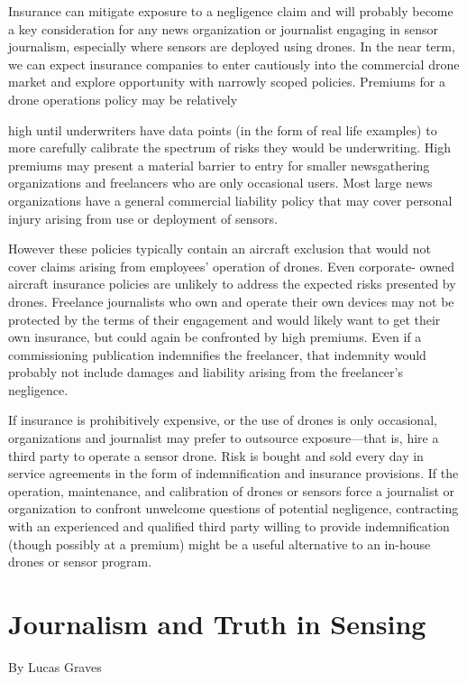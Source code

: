 \begin{itemize}
\begin{itemized}
Insurance can mitigate exposure to a negligence claim and will probably
become a key consideration for any news organization or journalist engaging
in sensor journalism, especially where sensors are deployed using drones.
In the near term, we can expect insurance companies to enter cautiously
into the commercial drone market and explore opportunity with narrowly
scoped policies. Premiums for a drone operations policy may be relatively

high until underwriters have data points (in the form of real life examples)
to more carefully calibrate the spectrum of risks they would be underwriting.
High premiums may present a material barrier to entry for smaller
newsgathering organizations and freelancers who are only occasional users.
Most large news organizations have a general commercial liability policy
that may cover personal injury arising from use or deployment of sensors.

However these policies typically contain an aircraft exclusion that would
not cover claims arising from employees' operation of drones. Even corporate-
owned aircraft insurance policies are unlikely to address the expected
risks presented by drones. Freelance journalists who own and operate their
own devices may not be protected by the terms of their engagement and
would likely want to get their own insurance, but could again be confronted
by high premiums. Even if a commissioning publication indemnifies the
freelancer, that indemnity would probably not include damages and liability
arising from the freelancer's negligence.

If insurance is prohibitively expensive, or the use of drones is only occasional,
organizations and journalist may prefer to outsource exposure—that
is, hire a third party to operate a sensor drone. Risk is bought and sold every
day in service agreements in the form of indemnification and insurance
provisions. If the operation, maintenance, and calibration of drones or sensors
force a journalist or organization to confront unwelcome questions of
potential negligence, contracting with an experienced and qualified third
party willing to provide indemnification (though possibly at a premium)
might be a useful alternative to an in-house drones or sensor program.

\chapter{Journalism and Truth in Sensing}
By Lucas Graves


\end{itemized}
\end{itemize}
